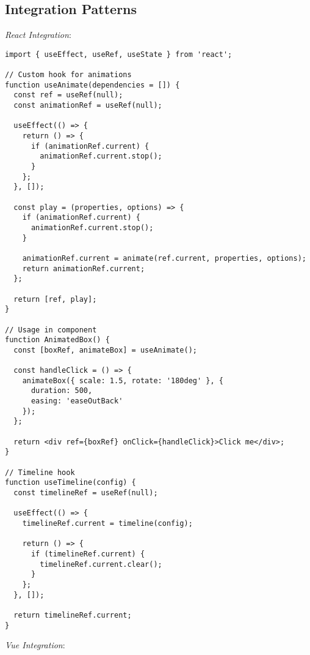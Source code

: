 \documentclass[11pt]{article}
\begin{document}
\subsection{Integration Patterns}
\label{sec:orgcbc1781}

\emph{React Integration}:

\begin{verbatim}
import { useEffect, useRef, useState } from 'react';

// Custom hook for animations
function useAnimate(dependencies = []) {
  const ref = useRef(null);
  const animationRef = useRef(null);
  
  useEffect(() => {
    return () => {
      if (animationRef.current) {
        animationRef.current.stop();
      }
    };
  }, []);
  
  const play = (properties, options) => {
    if (animationRef.current) {
      animationRef.current.stop();
    }
    
    animationRef.current = animate(ref.current, properties, options);
    return animationRef.current;
  };
  
  return [ref, play];
}

// Usage in component
function AnimatedBox() {
  const [boxRef, animateBox] = useAnimate();
  
  const handleClick = () => {
    animateBox({ scale: 1.5, rotate: '180deg' }, {
      duration: 500,
      easing: 'easeOutBack'
    });
  };
  
  return <div ref={boxRef} onClick={handleClick}>Click me</div>;
}

// Timeline hook
function useTimeline(config) {
  const timelineRef = useRef(null);
  
  useEffect(() => {
    timelineRef.current = timeline(config);
    
    return () => {
      if (timelineRef.current) {
        timelineRef.current.clear();
      }
    };
  }, []);
  
  return timelineRef.current;
}
\end{verbatim}

\emph{Vue Integration}:
\end{document}
